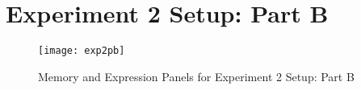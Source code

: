 \section*{Experiment 2 Setup: Part B}
\begin{figure}[htp]
\centering
\texttt{[image: exp2pb]}
\caption[experiment 2: part b]{Memory and Expression Panels for Experiment 2 Setup: Part B}\label{fig:exp2pb}
\end{figure}